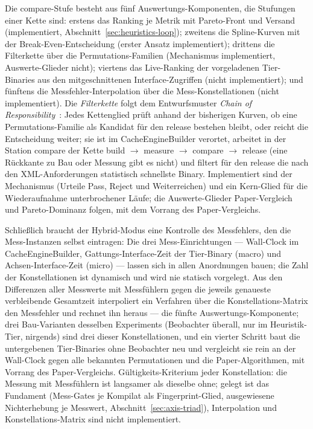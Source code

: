 \begin{nurkurz}
Die compare-Stufe besteht aus fünf Auswertungs-Komponenten, die Stufungen einer Kette sind: erstens das
Ranking je Metrik mit Pareto-Front und Versand (implementiert, Abschnitt~\ref{sec:heuristics-loop}); zweitens
die Spline-Kurven mit der Break-Even-Entscheidung (erster Ansatz implementiert); drittens die Filterkette über
die Permutations-Familien (Mechanismus implementiert, Auswerte-Glieder nicht); viertens das Live-Ranking der
vorgeladenen Tier-Binaries aus den mitgeschnittenen Interface-Zugriffen (nicht implementiert); und fünftens die
Messfehler-Interpolation über die Mess-Konstellationen (nicht implementiert). Die \emph{Filterkette} folgt dem
Entwurfsmuster \emph{Chain of Responsibility}~\cite{gamma1994patterns}: Jedes Kettenglied prüft anhand der
bisherigen Kurven, ob eine Permutations-Familie als Kandidat für den release bestehen bleibt, oder reicht die
Entscheidung weiter; sie
ist im CacheEngineBuilder verortet, arbeitet in der Station compare der Kette build $\to$ measure $\to$ compare
$\to$ release (eine Rückkante zu Bau oder Messung gibt es nicht) und filtert für den release die nach den
XML-Anforderungen statistisch schnellste Binary. Implementiert sind der Mechanismus (Urteile Pass,
Reject und Weiterreichen) und ein Kern-Glied für die Wiederaufnahme unterbrochener Läufe; die Auswerte-Glieder
Paper-Vergleich und Pareto-Dominanz folgen, mit dem Vorrang des Paper-Vergleichs.

Schließlich braucht der Hybrid-Modus eine Kontrolle des Messfehlers, den die Mess-Instanzen selbst eintragen:
Die drei Mess-Einrichtungen --- Wall-Clock im CacheEngineBuilder, Gattungs-Interface-Zeit der Tier-Binary (macro)
und Achsen-Interface-Zeit (micro) --- lassen sich in allen Anordnungen bauen; die Zahl der Konstellationen ist
dynamisch und wird nie statisch vorgelegt. Aus den Differenzen aller Messwerte mit Messfühlern gegen die jeweils
genaueste verbleibende Gesamtzeit interpoliert ein Verfahren über die Konstellations-Matrix den Messfehler und
rechnet ihn heraus --- die fünfte Auswertungs-Komponente; drei Bau-Varianten desselben Experiments (Beobachter
überall, nur im Heuristik-Tier, nirgends) sind drei dieser Konstellationen, und ein vierter Schritt baut die
untergebenen Tier-Binaries ohne Beobachter neu und vergleicht sie rein an der Wall-Clock gegen alle bekannten
Permutationen und die Paper-Algorithmen, mit Vorrang des Paper-Vergleichs. Gültigkeits-Kriterium jeder
Konstellation: die Messung mit Messfühlern ist langsamer als dieselbe ohne; gelegt ist das Fundament (Mess-Gates
je Kompilat als Fingerprint-Glied, ausgewiesene Nichterhebung je Messwert, Abschnitt~\ref{sec:axis-triad}),
Interpolation und Konstellations-Matrix sind nicht implementiert.


\end{nurkurz}
